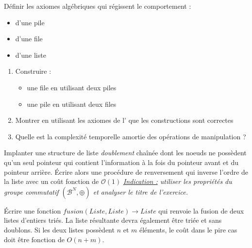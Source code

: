 \documentclass[../../../main.tex]{subfiles}
\begin{document}
 Définir les axiomes algébriques qui régissent le comportement :
\begin{itemize}
	\item d'une pile
	\item d'une file
	\item d'une liste
\end{itemize}

\begin{enumerate}
	\item Construire :
	\begin{itemize}
		\item une file en utilisant deux piles
		\item une pile en utilisant deux files
	\end{itemize}
	\item Montrer en utilisant les axiomes de l' que les constructions sont correctes
	\item Quelle est la complexité temporelle amortie des opérations de manipulation ?
\end{enumerate}

 Implanter une structure de liste \textit{doublement} chaînée dont les noeuds ne possèdent qu'un seul pointeur qui contient l'information à la fois du pointeur avant et du pointeur arrière. Écrire alors une procédure de renversement qui inverse l'ordre de la liste avec un coût fonction de $\mathcal{O}(1)$ \newline
\textit{\underline{Indication :} utiliser les propriétés du groupe commutatif $(\mathcal{B}^N, \oplus)$ et analyser le titre de l'exercice.}

 Écrire une fonction $fusion(Liste, Liste) \rightarrow Liste$ qui renvoie la fusion de deux listes d'entiers triés. La liste résultante devra également être triée et sans doublons. Si les deux listes possèdent $n$ et $m$ éléments, le coût dans le pire cas doit être fonction de $O(n + m)$.
\end{document}

